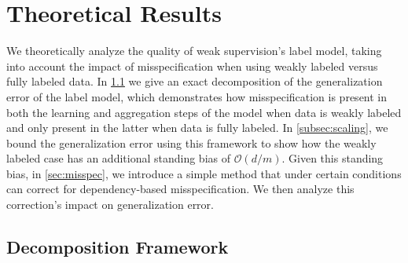 \section{Theoretical Results} \label{sec:theory}

We theoretically analyze the quality of weak supervision's label model, taking into account the impact of misspecification when using weakly labeled versus fully labeled data. %
In \ref{subsec:decomp} we give 
an exact decomposition of the generalization error of the label model, which demonstrates how misspecification is present in both the learning and aggregation steps of the model when data is weakly labeled and only present in the latter when data is fully labeled. In \ref{subsec:scaling}, we bound the generalization error using this framework to show how the weakly labeled case has an additional standing bias of $\mathcal{O}(d/m)$. Given this standing bias, in \ref{sec:misspec}, we introduce a simple method that under certain conditions can correct for dependency-based misspecification. We then analyze this correction's impact on generalization error. 




\subsection{Decomposition Framework}
\label{subsec:decomp}%


